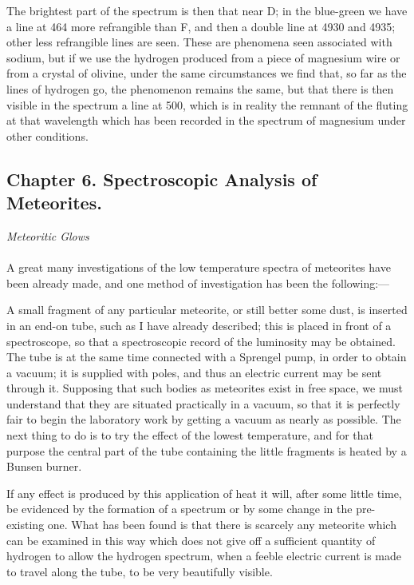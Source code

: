 \documentclass[a4paper, 12pt, oneside, polutonikogreek, english]{article}
\begin{document}
The brightest part of the spectrum is then that near D; in the blue-green we have a line at 464 more refrangible than F, and then a double line at 4930 and 4935; other less refrangible lines are seen. These are phenomena seen associated with sodium, but if we use the hydrogen produced from a piece of magnesium wire or from a crystal of olivine, under the same circumstances we find that, so far as the lines of hydrogen go, the phenomenon remains the same, but that there is then visible in the spectrum a line at 500, which is in reality the remnant of the fluting at that wavelength which has been recorded in the spectrum of magnesium under other conditions.
\clearpage
\subsection{Chapter 6. Spectroscopic Analysis of Meteorites.}
\begin{center}
\emph{Meteoritic Glows}
\end{center}
\paragraph{}
A great many investigations of the low temperature spectra of meteorites have been already made, and one method of investigation has been the following:---

A small fragment of any particular meteorite, or still better some dust, is inserted in an end-on tube, such as I have already described; this is placed in front of a spectroscope, so that a spectroscopic record of the luminosity may be obtained. The tube is at the same time connected with a Sprengel pump, in order to obtain a vacuum; it is supplied with poles, and thus an electric current may be sent through it. Supposing that such bodies as meteorites exist in free space, we must understand that they are situated practically in a vacuum, so that it is perfectly fair to begin the laboratory work by getting a vacuum as nearly as possible. The next thing to do is to try the effect of the lowest temperature, and for that purpose the central part of the tube containing the little fragments is heated by a Bunsen burner.

If any effect is produced by this application of heat it will, after some little time, be evidenced by the formation of a spectrum or by some change in the pre-existing one. What has been found is that there is scarcely any meteorite which can be examined in this way which does not give off a sufficient quantity of hydrogen to allow the hydrogen spectrum, when a feeble electric current is made to travel along the tube, to be very beautifully visible.
\end{document}

